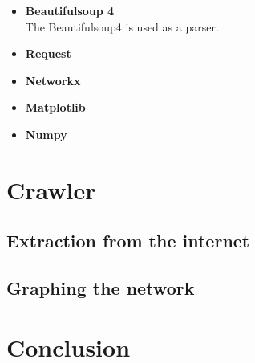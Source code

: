 \documentclass[10pt]{article}
\begin{document}
 \begin{itemize}
        \item \textbf{Beautifulsoup 4}\\
 The Beautifulsoup4 is used as a parser.
        \item \textbf{Request}
        \item \textbf{Networkx}
        \item \textbf{Matplotlib}
        \item \textbf{Numpy}
    \end{itemize}
 

\section{Crawler}
\subsection{Extraction from the internet}
\subsection{Graphing the network}
\section{Conclusion}



% 
%
\end{document}
